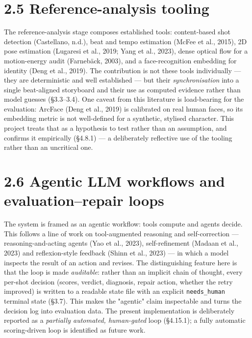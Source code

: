 \documentclass[10pt,twocolumn,letterpaper]{article}
\begin{document}

\section*{2.5 Reference-analysis tooling}

The reference-analysis stage composes established tools: content-based shot detection (Castellano, n.d.), beat and tempo estimation (McFee et al., 2015), 2D pose estimation (Lugaresi et al., 2019; Yang et al., 2023), dense optical flow for a motion-energy audit (Farneb\"ack, 2003), and a face-recognition embedding for identity (Deng et al., 2019). The contribution is not these tools individually --- they are deterministic and well established --- but their \emph{synchronisation} into a single beat-aligned storyboard and their use as computed evidence rather than model guesses (\S{}3.3--3.4). One caveat from this literature is load-bearing for the evaluation: ArcFace (Deng et al., 2019) is calibrated on real human faces, so its embedding metric is not well-defined for a synthetic, stylised character. This project treats that as a hypothesis to test rather than an assumption, and confirms it empirically (\S{}4.8.1) --- a deliberately reflective use of the tooling rather than an uncritical one.


\section*{2.6 Agentic LLM workflows and evaluation--repair loops}

The system is framed as an agentic workflow: tools compute and agents decide. This follows a line of work on tool-augmented reasoning and self-correction --- reasoning-and-acting agents (Yao et al., 2023), self-refinement (Madaan et al., 2023) and reflexion-style feedback (Shinn et al., 2023) --- in which a model inspects the result of an action and revises. The distinguishing feature here is that the loop is made \emph{auditable}: rather than an implicit chain of thought, every per-shot decision (scores, verdict, diagnosis, repair action, whether the retry improved) is written to a readable state file with an explicit \texttt{needs\_human} terminal state (\S{}3.7). This makes the "agentic" claim inspectable and turns the decision log into evaluation data. The present implementation is deliberately reported as a \emph{partially automated, human-gated} loop (\S{}4.15.1); a fully automatic scoring-driven loop is identified as future work.
\end{document}
